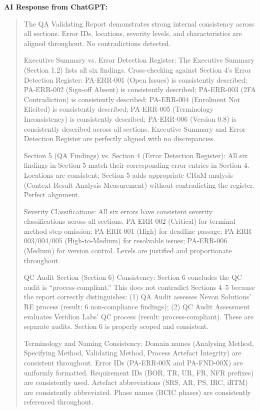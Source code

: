 \documentclass[11pt,a4paper]{article}
\begin{document}
\textbf{AI Response from ChatGPT:}

\begin{quote}
The QA Validating Report demonstrates strong internal consistency across all sections. Error IDs, locations, severity levels, and characteristics are aligned throughout. No contradictions detected.

Executive Summary vs. Error Detection Register: The Executive Summary (Section 1.2) lists all six findings. Cross-checking against Section 4's Error Detection Register: PA-ERR-001 (Open Issues) is consistently described; PA-ERR-002 (Sign-off Absent) is consistently described; PA-ERR-003 (2FA Contradiction) is consistently described; PA-ERR-004 (Enrolment Not Elicited) is consistently described; PA-ERR-005 (Terminology Inconsistency) is consistently described; PA-ERR-006 (Version 0.8) is consistently described across all sections. Executive Summary and Error Detection Register are perfectly aligned with no discrepancies.

Section 5 (QA Findings) vs. Section 4 (Error Detection Register): All six findings in Section 5 match their corresponding error entries in Section 4. Locations are consistent; Section 5 adds appropriate CRaM analysis (Context-Result-Analysis-Measurement) without contradicting the register. Perfect alignment.

Severity Classifications: All six errors have consistent severity classifications across all sections. PA-ERR-002 (Critical) for terminal method step omission; PA-ERR-001 (High) for deadline passage; PA-ERR-003/004/005 (High-to-Medium) for resolvable issues; PA-ERR-006 (Medium) for version control. Levels are justified and proportionate throughout.

QC Audit Section (Section 6) Consistency: Section 6 concludes the QC audit is ``process-compliant.'' This does not contradict Sections 4--5 because the report correctly distinguishes: (1) QA Audit assesses Nevon Solutions' RE process (result: 6 non-compliance findings); (2) QC Audit Assessment evaluates Veridion Labs' QC process (result: process-compliant). These are separate audits. Section 6 is properly scoped and consistent.

Terminology and Naming Consistency: Domain names (Analysing Method, Specifying Method, Validating Method, Process Artefact Integrity) are consistent throughout. Error IDs (PA-ERR-00X and PA-FND-00X) are uniformly formatted. Requirement IDs (BOR, TR, UR, FR, NFR prefixes) are consistently used. Artefact abbreviations (SRS, AR, PS, IRC, iRTM) are consistently abbreviated. Phase names (BCIC phases) are consistently referenced throughout.


\end{quote}
\end{document}
